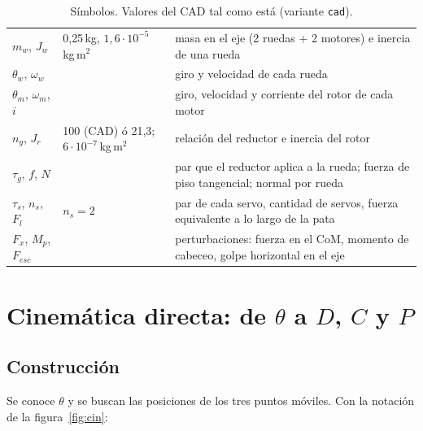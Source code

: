 \documentclass[11pt,a4paper]{article}
\newcommand{\code}[1]{\texttt{#1}}
\begin{document}
\begin{table}[H]
\begin{tabular}{llp{9.2cm}}
    $m_w$, $J_w$ & 0{,}25\,kg, $1{,}6\cdot10^{-5}$\,kg\,m$^2$ & masa en el eje (2 ruedas + 2 motores) e inercia de una rueda \\
    $\theta_w$, $\omega_w$ & & giro y velocidad de cada rueda \\
    $\theta_m$, $\omega_m$, $i$ & & giro, velocidad y corriente del rotor de cada motor \\
    $n_g$, $J_r$ & 100 (CAD) ó 21{,}3; $6\cdot10^{-7}$\,kg\,m$^2$ & relación del reductor e inercia del rotor \\
    $\tau_g$, $f$, $N$ & & par que el reductor aplica a la rueda; fuerza de piso tangencial; normal por rueda \\
    $\tau_s$, $n_s$, $F_l$ & $n_s = 2$ & par de cada servo, cantidad de servos, fuerza equivalente a lo largo de la pata \\
    $F_x$, $M_p$, $F_{esc}$ & & perturbaciones: fuerza en el CoM, momento de cabeceo, golpe horizontal en el eje \\
    \bottomrule
  \end{tabular}
  \caption{Símbolos. Valores del CAD tal como está (variante \code{cad}).}
  \label{tab:simb}
\end{table}

\section{Cinemática directa: de $\theta$ a $D$, $C$ y $P$}

\subsection{Construcción}

Se conoce $\theta$ y se buscan las posiciones de los tres puntos móviles. Con la notación de la
figura~\ref{fig:cin}:
\end{document}
